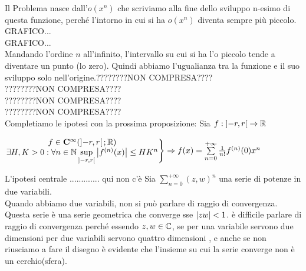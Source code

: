 Il Problema nasce dall'$o(x^n)$ che scriviamo alla fine dello sviluppo n-esimo di questa funzione, perché l'intorno in cui si ha $o(x^n)$ diventa sempre più piccolo.
GRAFICO...\\
GRAFICO...\\
Mandando l'ordine $n$ all'infinito, l'intervallo su cui si ha l'o piccolo tende a diventare un punto (lo zero). Quindi abbiamo l'ugualianza tra la funzione e il suo sviluppo solo nell'origine.????????NON COMPRESA????\\
????????NON COMPRESA????\\
????????NON COMPRESA????\\
????????NON COMPRESA????\\
Completiamo le ipotesi con la prossima proposizione:
\proposition
Sia $f:\left]-r,r\right[\to \mathbb{R}$
\begin{center}
	$\left.\begin{matrix}
	f\in \mathbf{C^{\infty}}(\left]-r,r\right[; \mathbb{R})\\
	\exists H,K >0 :\forall n\in\mathbb{N} \sup\limits_{\left]-r,r\right[}\left|f^{(n)}(x)\right|\le HK^n\\
	\end{matrix}\right\}
	\Rightarrow f(x)=\sum\limits_{n=0}^{+\infty}\frac{1}{n!}f^{(n)}(0)x^n$
\end{center}
\observation
L'ipotesi centrale ............. qui non c'è
\observation
Sia $\sum\limits_{n=0}^{+\infty}(z,w)^n$ una serie di potenze in due variabili.\\
Quando abbiamo due variabili, non si può parlare di raggio di convergenza. Questa serie è una serie geometrica che converge sse $\left|zw\right|<1$. è  difficile parlare di raggio di convergenza  perché essendo $z,w\in\mathbb{C}$, se per una variabile servono due dimensioni per due variabili servono quattro dimensioni , e anche se non riusciamo a fare il disegno è evidente che l'insieme su cui la serie converge non è un cerchio(sfera).
